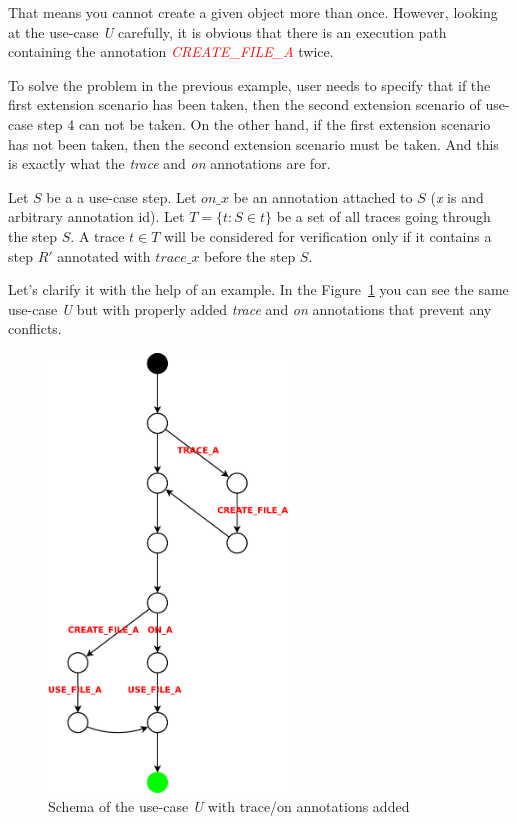 That means you cannot create a given object more than once.
However, looking at the use-case \emph{U} carefully, it is obvious that there is an execution path containing  the annotation \textcolor{red}{\emph{CREATE\_FILE\_A}} twice.

To solve the problem in the previous example, user needs to specify that if the first extension scenario has been taken, then the second extension scenario of use-case step 4 can not be taken. On the other hand, if the first extension scenario has not been taken,
then the second extension scenario must be taken.
And this is exactly what the \emph{trace} and \emph{on} annotations are for.

\begin{definition}
	Let $S$ be a a use-case step.
	Let $on\_x$ be an annotation attached to $S$ (\emph{x} is and arbitrary annotation id).
	Let $T=\{t: S \in t\}$ be a set of all traces going through the step $S$.
	A trace $t \in T$ will be considered for verification only if it contains a step $R'$ annotated with $trace\_x$ before the step $S$.
\end{definition}

Let's clarify it with the help of an example.
In the Figure~\ref{fig:traceTest} you can see the same use-case \emph{U} but with properly added
\emph{trace} and \emph{on} annotations that prevent any conflicts.

\begin{figure}[ht]
  \centering
  \includegraphics[width=180pt]{images/traceTest}
  \caption{Schema of the use-case \emph{U} with trace/on annotations added}
  \label{fig:traceTest}
\end{figure}

